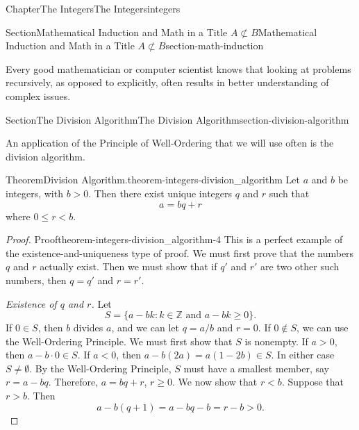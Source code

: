 \documentclass[oneside,10pt,]{book}
\numberwithin{equation}{section}
\newcommand{\notsubset}{\not\subset}
\newcommand{\lt}{<}
\newcommand{\gt}{>}
\begin{document}
\begin{chapterptx}{Chapter}{The Integers}{}{The Integers}{}{}{integers}
\begin{sectionptx}{Section}{Mathematical Induction and Math in a Title \(A\notsubset B\)}{}{Mathematical Induction and Math in a Title \(A\notsubset B\)}{}{}{section-math-induction}
\begin{itemize}[label=\textbullet]
\end{itemize}
%
\par
Every good mathematician or computer scientist knows that looking at problems recursively, as opposed to explicitly, often results in better understanding of complex issues.%
\end{sectionptx}
%
%
\typeout{************************************************}
\typeout{************************************************}
%
\begin{sectionptx}{Section}{The Division Algorithm}{}{The Division Algorithm}{}{}{section-division-algorithm}
\begin{introduction}{}%
An application of the Principle of Well-Ordering that we will use often is the division algorithm.%
\begin{theorem}{Theorem}{Division Algorithm.}{}{theorem-integers-division_algorithm}%
%
Let \(a\) and \(b\) be integers, with \(b \gt 0\).  Then there exist unique integers \(q\) and \(r\) such that%
\begin{equation*}
a = bq + r
\end{equation*}
where \(0 \leq r \lt b\).%
\end{theorem}
\begin{proof}{Proof}{}{theorem-integers-division_algorithm-4}
This is a perfect example of the existence-and-uniqueness type of proof.  We must first prove that the numbers \(q\) and \(r\) actually  exist. Then we must show that if  \(q'\) and \(r'\) are two other such numbers, then \(q = q'\) and \(r = r'\).%
\par
\emph{Existence of \(q\) and \(r\).} Let%
\begin{equation*}
S = \{ a - bk : k \in {\mathbb Z} \text{ and } a - bk \geq 0 \}\text{.}
\end{equation*}
If \(0 \in S\), then \(b\) divides \(a\), and  we can let \(q = a/b\) and \(r = 0\).  If \(0 \notin S\), we can use the Well-Ordering Principle.  We must first show that \(S\) is nonempty.  If \(a \gt 0\), then \(a - b \cdot 0 \in S\). If \(a \lt 0\), then \(a - b(2a) = a(1 - 2b) \in S\).  In either case \(S \neq \emptyset\).  By the Well-Ordering Principle, \(S\) must have a smallest member, say \(r = a - bq\). Therefore, \(a = bq + r\), \(r \geq 0\). We now show that \(r \lt b\). Suppose that \(r \gt b\). Then%
\begin{equation*}
a - b(q + 1)= a - bq - b = r - b \gt 0\text{.}
\end{equation*}

\end{proof}
\end{introduction}
\end{sectionptx}
\end{chapterptx}
\end{document}
